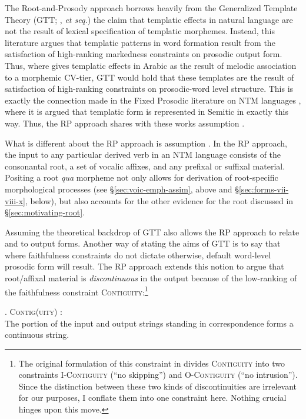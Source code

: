 \documentclass[12pt,twoside,letterpaper]{article}
\begin{document}
The Root-and-Prosody approach borrows heavily from the Generalized Template Theory (GTT; \cite{mccarthy95}, \emph{et seq.}) the claim that templatic effects in natural language are not the result of lexical specification of templatic morphemes. Instead, this literature argues that templatic patterns in word formation result from the satisfaction of high-ranking markedness constraints on prosodic output form. Thus, where \cite{mccarthy81} gives templatic effects in Arabic as the result of melodic association to a morphemic CV-tier, GTT would hold that these templates are the result of satisfaction of high-ranking constraints on prosodic-word level structure. This is exactly the connection made in the Fixed Prosodic literature on NTM languages \citep{ussishkin00,buckley03,ussishkin05}, where it is argued that templatic form is represented in Semitic in exactly this way. Thus, the RP approach shares with these works assumption \Last[b].

What is different about the RP approach is assumption \Last[a]. In the RP approach, the input to any particular derived verb in an NTM language consists of the consonantal root, a set of vocalic affixes, and any prefixal or suffixal material. Positing a root \emph{qua} morpheme not only allows for derivation of root-specific morphological processes (see \S{\ref{sec:voic-emph-assim}}, above and \S{\ref{sec:forms-vii-viii-x}}, below), but also accounts for the other evidence for the root discussed in \S{\ref{sec:motivating-root}}.

Assuming the theoretical backdrop of GTT also allows the RP approach to relate \Last[a] and \Last[b] to output forms. Another way of stating the aims of GTT is to say that where faithfulness constraints do not dictate otherwise, default word-level prosodic form will result. The RP approach extends this notion to argue that root/affixal material is \emph{discontinuous} in the output because of the low-ranking of the faithfulness constraint \textsc{Contiguity}:\footnote{The original formulation of this constraint in \cite{mccarthy95} divides \textsc{Contiguity} into two constraints \textsc{I-Contiguity} (``no skipping'') and \textsc{O-Contiguity} (``no intrusion''). Since the distinction between these two kinds of discontinuities are irrelevant for our purposes, I conflate them into one constraint here. Nothing crucial hinges upon this move.}

\ex. \textsc{Contig(uity)} \citep{mccarthy95}:\\The portion of the input and output strings standing in correspondence forms a continuous string.
\end{document}
